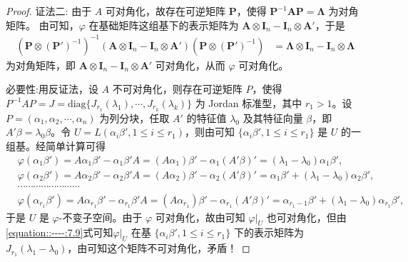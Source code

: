 \documentclass[../../main.tex]{subfiles}%
\begin{document}
\begin{proof}
{\color{blue}证法二:}
由于 $A$ 可对角化，故存在可逆矩阵 $\boldsymbol{P}$，使得 $\boldsymbol{P}^{-1}\boldsymbol{AP} = \boldsymbol{\Lambda}$ 为对角矩阵。
由可知，$\varphi$ 在基础矩阵这组基下的表示矩阵为 $\boldsymbol{A} \otimes \boldsymbol{I}_n - \boldsymbol{I}_n \otimes \boldsymbol{A}'$，于是
\begin{align*}
(\boldsymbol{P} \otimes (\boldsymbol{P}')^{-1})^{-1}(\boldsymbol{A} \otimes \boldsymbol{I}_n - \boldsymbol{I}_n \otimes \boldsymbol{A}')(\boldsymbol{P} \otimes (\boldsymbol{P}')^{-1}) 
&= \boldsymbol{\Lambda} \otimes \boldsymbol{I}_n - \boldsymbol{I}_n \otimes \boldsymbol{\Lambda}
\end{align*}
为对角矩阵，即 $\boldsymbol{A} \otimes \boldsymbol{I}_n - \boldsymbol{I}_n \otimes \boldsymbol{A}'$ 可对角化，从而 $\varphi$ 可对角化。

{\heiti 必要性:}用反证法，设 $A$ 不可对角化，则存在可逆矩阵 $P$，使得 $P^{-1}AP = J = \mathrm{diag}\{J_{r_1}(\lambda_1),\cdots,J_{r_k}(\lambda_k)\}$ 为 Jordan 标准型，其中 $r_1 > 1$。设 $P = (\alpha_1,\alpha_2,\cdots,\alpha_n)$ 为列分块，任取 $A'$ 的特征值 $\lambda_0$ 及其特征向量 $\beta$，即 $A'\beta = \lambda_0\beta$。令 $U = L(\alpha_i\beta',1\leqslant  i\leqslant  r_1)$，则由可知 $\{\alpha_i\beta',1\leqslant  i\leqslant  r_1\}$ 是 $U$ 的一组基。经简单计算可得
\begin{align}\label{equation::----:7.9}
&\varphi (\alpha _1\beta ' )=A\alpha _1\beta ' -\alpha _1\beta ' A=\left( A\alpha _1 \right) \beta ' -\alpha _1\left( A' \beta \right) ' =(\lambda _1-\lambda _0)\alpha _1\beta ' ,
\nonumber \\
&\varphi (\alpha _2\beta ' )=A\alpha _2\beta ' -\alpha _2\beta ' A=\left( A\alpha _2 \right) \beta ' -\alpha _2\left( A' \beta \right) ' =\alpha _1\beta ' +(\lambda _1-\lambda _0)\alpha _2\beta ' ,
\nonumber \\
&\cdots \cdots \cdots \cdots \cdots \cdots \cdots \cdots 
\nonumber \\
&\varphi (\alpha _{r_1}\beta ' )=A\alpha _{r_1}\beta ' -\alpha _{r_1}\beta ' A=\left( A\alpha _{r_1} \right) \beta ' -\alpha _{r_1}\left( A' \beta \right) ' =\alpha _{r_1-1}\beta ' +(\lambda _1-\lambda _0)\alpha _{r_1}\beta ' ,
\end{align}
于是 $U$ 是 $\varphi$-不变子空间。由于 $\varphi$ 可对角化，故由可知 $\varphi|_U$ 也可对角化，但由\eqref{equation::----:7.9}式可知$\varphi|_U$ 在基 $\{\alpha_i\beta',1\leqslant  i\leqslant  r_1\}$ 下的表示矩阵为 $J_{r_1}(\lambda_1 - \lambda_0)$，由可知这个矩阵不可对角化，矛盾！
\end{proof}
\end{document}
